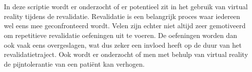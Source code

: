 
%
%

%



\chapter*{}

In deze scriptie wordt er onderzocht of er potentieel zit in het gebruik van virtual reality tijdens de revalidatie. Revalidatie is een belangrijk proces waar iedereen wel eens mee geconfronteerd wordt. Velen zijn echter niet altijd zeer gemotiveerd om repetitieve revalidatie oefeningen uit te voeren. De oefeningen worden dan ook vaak eens overgeslagen, wat dus zeker een invloed heeft op de duur van het revalidatietraject.
Ook wordt er onderzocht of men met behulp van virtual reality de pijntolerantie van een patiënt kan verhogen.

